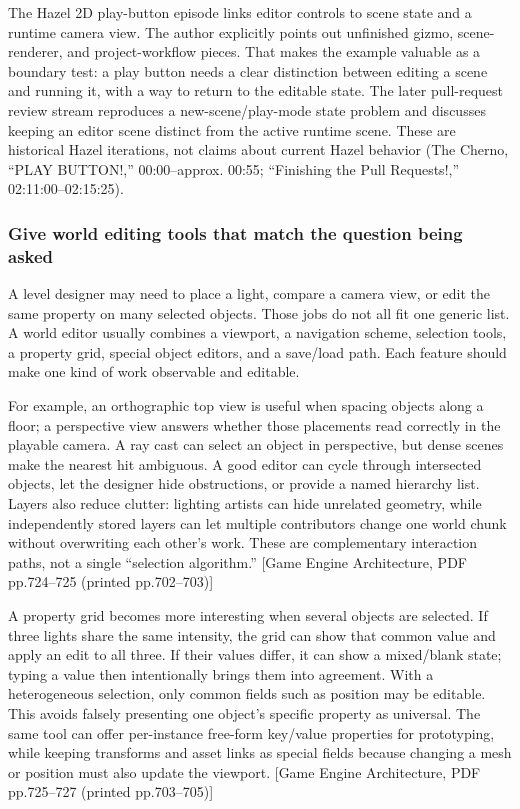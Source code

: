 The Hazel 2D play-button episode links editor controls to scene state and a runtime camera view. The author explicitly points out unfinished gizmo, scene-renderer, and project-workflow pieces. That makes the example valuable as a boundary test: a play button needs a clear distinction between editing a scene and running it, with a way to return to the editable state. The later pull-request review stream reproduces a new-scene/play-mode state problem and discusses keeping an editor scene distinct from the active runtime scene. These are historical Hazel iterations, not claims about current Hazel behavior (The Cherno, ``PLAY BUTTON!,'' 00:00--approx. 00:55; ``Finishing the Pull Requests!,'' 02:11:00--02:15:25).

\subsubsection{Give world editing tools that match the question being asked}\label{06-engine-ii-ch032-give-world-editing-tools-that-match-the-question-being-asked}

A level designer may need to place a light, compare a camera view, or edit the same property on many selected objects. Those jobs do not all fit one generic list. A world editor usually combines a viewport, a navigation scheme, selection tools, a property grid, special object editors, and a save/load path. Each feature should make one kind of work observable and editable.

For example, an orthographic top view is useful when spacing objects along a floor; a perspective view answers whether those placements read correctly in the playable camera. A ray cast can select an object in perspective, but dense scenes make the nearest hit ambiguous. A good editor can cycle through intersected objects, let the designer hide obstructions, or provide a named hierarchy list. Layers also reduce clutter: lighting artists can hide unrelated geometry, while independently stored layers can let multiple contributors change one world chunk without overwriting each other's work. These are complementary interaction paths, not a single ``selection algorithm.'' {[}Game Engine Architecture, PDF pp.724--725 (printed pp.702--703){]}

A property grid becomes more interesting when several objects are selected. If three lights share the same intensity, the grid can show that common value and apply an edit to all three. If their values differ, it can show a mixed/blank state; typing a value then intentionally brings them into agreement. With a heterogeneous selection, only common fields such as position may be editable. This avoids falsely presenting one object's specific property as universal. The same tool can offer per-instance free-form key/value properties for prototyping, while keeping transforms and asset links as special fields because changing a mesh or position must also update the viewport. {[}Game Engine Architecture, PDF pp.725--727 (printed pp.703--705){]}

